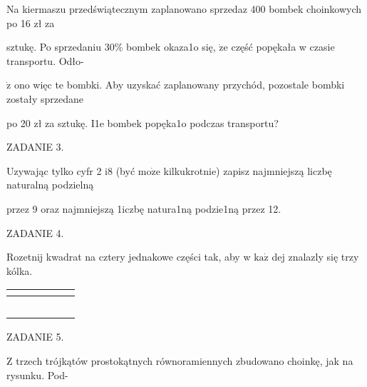 \documentclass[a4paper,12pt]{article}
\begin{document}
Na kiermaszu przedświątecznym zaplanowano sprzedaz 400 bombek choinkowych po 16 zł za

sztukę. Po sprzedaniu 30\% bombek okaza1o się, $\dot{\mathrm{z}}\mathrm{e}$ część popękała w czasie transportu. Odło-

$\dot{\mathrm{z}}$ ono więc te bombki. Aby uzyskać zaplanowany przychód, pozostale bombki zostały sprzedane

po 20 zł za sztukę. I1e bombek popęka1o podczas transportu?

ZADANIE 3.

Uzywając tylko cyfr 2 $\mathrm{i}8$ (być $\mathrm{m}\mathrm{o}\dot{\mathrm{z}}\mathrm{e}$ kilkukrotnie) zapisz najmniejszą liczbę naturalną podzielną

przez 9 oraz najmniejszą 1iczbę natura1ną podzie1ną przez 12.

ZADANIE 4.

Rozetnij kwadrat na cztery jednakowe części tak, aby w $\mathrm{k}\mathrm{a}\dot{\mathrm{z}}$ dej znalazly się trzy kólka.
\begin{center}
\begin{tabular}{|l|l|l|l|l|l|}
\hline
\multicolumn{1}{|l|}{}&	\multicolumn{1}{|l|}{}&	\multicolumn{1}{|l|}{}&	\multicolumn{1}{|l|}{}&	\multicolumn{1}{|l|}{}&	\multicolumn{1}{|l|}{}	\\
\hline
\multicolumn{1}{|l|}{}&	\multicolumn{1}{|l|}{}&	\multicolumn{1}{|l|}{}&	\multicolumn{1}{|l|}{}&	\multicolumn{1}{|l|}{}&	\multicolumn{1}{|l|}{}	\\
\hline
\multicolumn{1}{|l|}{}&	\multicolumn{1}{|l|}{}&	\multicolumn{1}{|l|}{}&	\multicolumn{1}{|l|}{}&	\multicolumn{1}{|l|}{}&	\multicolumn{1}{|l|}{}	\\
\hline
\multicolumn{1}{|l|}{}&	\multicolumn{1}{|l|}{}&	\multicolumn{1}{|l|}{}&	\multicolumn{1}{|l|}{}&	\multicolumn{1}{|l|}{}&	\multicolumn{1}{|l|}{}	\\
\hline
\multicolumn{1}{|l|}{}&	\multicolumn{1}{|l|}{}&	\multicolumn{1}{|l|}{}&	\multicolumn{1}{|l|}{}&	\multicolumn{1}{|l|}{}&	\multicolumn{1}{|l|}{}	\\
\hline
\multicolumn{1}{|l|}{}&	\multicolumn{1}{|l|}{}&	\multicolumn{1}{|l|}{}&	\multicolumn{1}{|l|}{}&	\multicolumn{1}{|l|}{}&	\multicolumn{1}{|l|}{}	\\
\hline
\end{tabular}
\end{center}
ZADANIE 5.

$\mathrm{Z}$ trzech trójkątów prostokątnych równoramiennych zbudowano choinkę, jak na rysunku. Pod-
\end{document}
